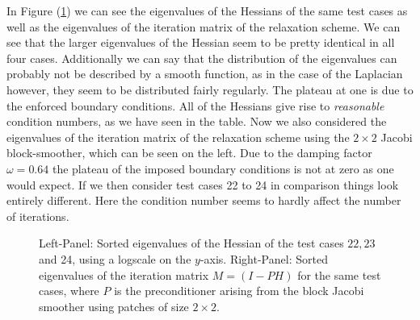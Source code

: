 \documentclass[../draft_1.tex]{subfiles}
\begin{document}
In Figure (\ref{fig:eigenvalues_H_and_it_mat}) we can see the eigenvalues of the Hessians of the same test cases as well as the eigenvalues of the iteration matrix of the relaxation scheme. We can see that the larger eigenvalues of the Hessian seem to be pretty identical in all four cases. Additionally we can say that the distribution of the eigenvalues can probably not be described by a smooth function, as in the case of the Laplacian however, they seem to be distributed fairly regularly. The plateau at one is due to the enforced boundary conditions. All of the Hessians give rise to \textit{reasonable} condition numbers, as we have seen in the table. Now we also considered the eigenvalues of the iteration matrix of the relaxation scheme using the $2 \times 2$ Jacobi block-smoother, which can be seen on the left. Due to the damping factor $\omega = 0.64$ the plateau of the imposed boundary conditions is not at zero as one would expect. If we then consider test cases 22 to 24 in comparison things look entirely different. Here the condition number seems to hardly affect the number of iterations. 
\begin{figure}
	\caption{Left-Panel: Sorted eigenvalues of the Hessian of the test cases $22, 23$ and 24, using a logscale on the $y$-axis. Right-Panel: Sorted eigenvalues of the iteration matrix $M = (I - PH)$ for the same test cases, where $P$ is the preconditioner arising from the block Jacobi smoother using patches of size $2 \times 2$.}
	\label{fig:eigenvalues_H_and_it_mat}
\end{figure}


\end{document}
